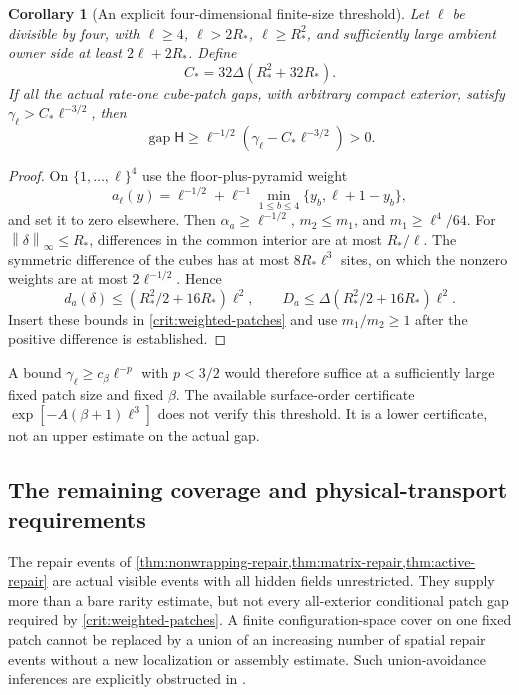 \documentclass[11pt,oneside,openany]{book}
\newtheorem{corollary}[corollary]{Corollary}
\theoremstyle{definition}
\theoremstyle{remark}
\newcommand{\gap}{\operatorname{gap}}
\newcommand{\norm}[1]{\left\lVert#1\right\rVert}
\newcommand{\src}[2]{\cite[#2]{#1}}
\begin{document}
\begin{corollary}[An explicit four-dimensional finite-size threshold]
\label{cor:weighted-threshold}
Let $\ell$ be divisible by four, with
$\ell\ge4$, $\ell>2R_*$, $\ell\ge R_*^2$, and sufficiently large
ambient owner side at least $2\ell+2R_*$. Define
\[
 C_*=32\Delta(R_*^2+32R_*).
\]
If all the actual rate-one cube-patch gaps, with arbitrary compact
exterior, satisfy $\gamma_\ell>C_*\ell^{-3/2}$, then
\begin{equation}\label{eq:patch-explicit-floor}
 \gap\mathsf H\ge\ell^{-1/2}
                   (\gamma_\ell-C_*\ell^{-3/2})>0.
\end{equation}
\end{corollary}
\begin{proof}
On $\{1,\ldots,\ell\}^4$ use the floor-plus-pyramid weight
\[
 a_\ell(y)=\ell^{-1/2}
       +\ell^{-1}\min_{1\le b\le4}\{y_b,\ell+1-y_b\},
\]
and set it to zero elsewhere. Then $\alpha_a\ge\ell^{-1/2}$,
$m_2\le m_1$, and $m_1\ge\ell^4/64$. For
$\norm\delta_\infty\le R_*$, differences in the common interior
are at most $R_*/\ell$. The symmetric difference of the cubes has
at most $8R_*\ell^3$ sites, on which the nonzero weights are at most
$2\ell^{-1/2}$. Hence
\[
 d_a(\delta)\le(R_*^2/2+16R_*)\ell^2,
 \qquad D_a\le\Delta(R_*^2/2+16R_*)\ell^2.
\]
Insert these bounds in \cref{crit:weighted-patches} and use
$m_1/m_2\ge1$ after the positive difference is established.
\end{proof}
A bound $\gamma_\ell\ge c_\beta\ell^{-p}$ with $p<3/2$ would therefore
suffice at a sufficiently large fixed patch size and fixed $\beta$.
The available surface-order certificate
$\exp[-A(\beta+1)\ell^3]$ does not verify this threshold. It is a
lower certificate, not an upper estimate on the actual gap.

\subsection{The remaining coverage and physical-transport requirements}
The repair events of \cref{thm:nonwrapping-repair,thm:matrix-repair,thm:active-repair}
are actual visible events with all hidden fields unrestricted. They
supply more than a bare rarity estimate, but not every all-exterior
conditional patch gap required by \cref{crit:weighted-patches}.
A finite configuration-space cover on one fixed patch cannot be
replaced by a union of an increasing number of spatial repair events
without a new localization or assembly estimate. Such union-avoidance
inferences are explicitly obstructed in \src{F12}{V79}.
\end{document}
